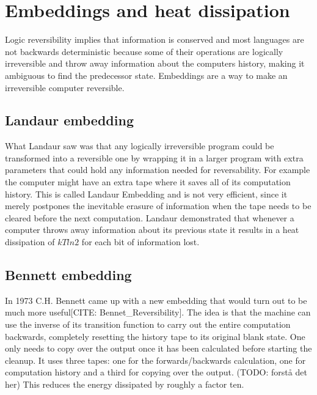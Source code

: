 

\section{Embeddings and heat dissipation}
Logic reversibility implies that information is conserved and most languages are not backwards deterministic because some of their operations are logically irreversible and throw away information about the computers history, making it ambiguous to find the predecessor state.
Embeddings are a way to make an irreversible computer reversible.
\subsection{Landaur embedding}
What Landaur saw was that any logically irreversible program could be transformed into a reversible one by wrapping it in a larger program with extra parameters that could hold any information needed for reversability. For example the computer might have an extra tape where it saves all of its computation history. This is called Landaur Embedding and is not very efficient, since it merely postpones the inevitable erasure of information when the tape needs to be cleared before the next computation.
Landaur demonstrated that whenever a computer throws away information about its previous state it results in a heat dissipation of $kT ln 2$ for each bit of information lost. 
\subsection{Bennett embedding}
In 1973 C.H. Bennett came up with a new embedding that would turn out to be much more useful[CITE: Bennet\_Reversibility].
The idea is that the machine can use the inverse of its transition function to carry out the entire computation backwards, completely resetting the history tape to its original blank state. One only needs to copy over the output once it has been calculated before starting the cleanup.
It uses three tapes: one for the forwards/backwards calculation, one for computation history and a third for copying over the output. 
(TODO: forstå det her) This reduces the energy dissipated by roughly a factor ten.

